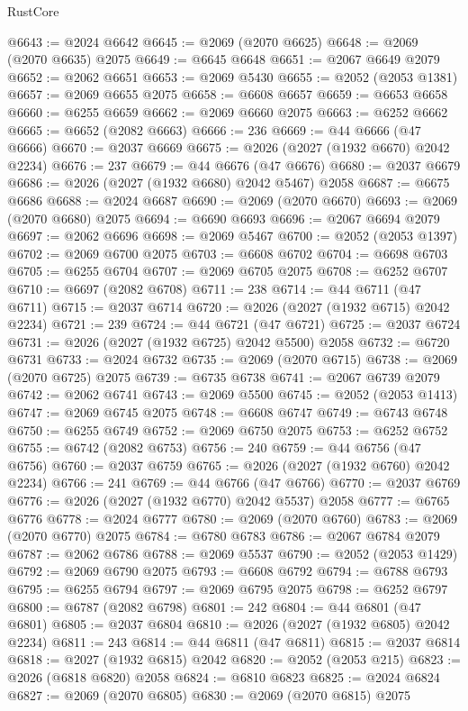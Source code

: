 \begin{lexlean}{RustCore}
\begin{coremodule}
@6643 := @2024 @6642
@6645 := @2069 (@2070 @6625)
@6648 := @2069 (@2070 @6635) @2075
@6649 := @6645 @6648
@6651 := @2067 @6649 @2079
@6652 := @2062 @6651
@6653 := @2069 @5430
@6655 := @2052 (@2053 @1381)
@6657 := @2069 @6655 @2075
@6658 := @6608 @6657
@6659 := @6653 @6658
@6660 := @6255 @6659
@6662 := @2069 @6660 @2075
@6663 := @6252 @6662
@6665 := @6652 (@2082 @6663)
@6666 := 236
@6669 := @44 @6666 (@47 @6666)
@6670 := @2037 @6669
@6675 := @2026 (@2027 (@1932 @6670) @2042 @2234)
@6676 := 237
@6679 := @44 @6676 (@47 @6676)
@6680 := @2037 @6679
@6686 := @2026 (@2027 (@1932 @6680) @2042 @5467) @2058
@6687 := @6675 @6686
@6688 := @2024 @6687
@6690 := @2069 (@2070 @6670)
@6693 := @2069 (@2070 @6680) @2075
@6694 := @6690 @6693
@6696 := @2067 @6694 @2079
@6697 := @2062 @6696
@6698 := @2069 @5467
@6700 := @2052 (@2053 @1397)
@6702 := @2069 @6700 @2075
@6703 := @6608 @6702
@6704 := @6698 @6703
@6705 := @6255 @6704
@6707 := @2069 @6705 @2075
@6708 := @6252 @6707
@6710 := @6697 (@2082 @6708)
@6711 := 238
@6714 := @44 @6711 (@47 @6711)
@6715 := @2037 @6714
@6720 := @2026 (@2027 (@1932 @6715) @2042 @2234)
@6721 := 239
@6724 := @44 @6721 (@47 @6721)
@6725 := @2037 @6724
@6731 := @2026 (@2027 (@1932 @6725) @2042 @5500) @2058
@6732 := @6720 @6731
@6733 := @2024 @6732
@6735 := @2069 (@2070 @6715)
@6738 := @2069 (@2070 @6725) @2075
@6739 := @6735 @6738
@6741 := @2067 @6739 @2079
@6742 := @2062 @6741
@6743 := @2069 @5500
@6745 := @2052 (@2053 @1413)
@6747 := @2069 @6745 @2075
@6748 := @6608 @6747
@6749 := @6743 @6748
@6750 := @6255 @6749
@6752 := @2069 @6750 @2075
@6753 := @6252 @6752
@6755 := @6742 (@2082 @6753)
@6756 := 240
@6759 := @44 @6756 (@47 @6756)
@6760 := @2037 @6759
@6765 := @2026 (@2027 (@1932 @6760) @2042 @2234)
@6766 := 241
@6769 := @44 @6766 (@47 @6766)
@6770 := @2037 @6769
@6776 := @2026 (@2027 (@1932 @6770) @2042 @5537) @2058
@6777 := @6765 @6776
@6778 := @2024 @6777
@6780 := @2069 (@2070 @6760)
@6783 := @2069 (@2070 @6770) @2075
@6784 := @6780 @6783
@6786 := @2067 @6784 @2079
@6787 := @2062 @6786
@6788 := @2069 @5537
@6790 := @2052 (@2053 @1429)
@6792 := @2069 @6790 @2075
@6793 := @6608 @6792
@6794 := @6788 @6793
@6795 := @6255 @6794
@6797 := @2069 @6795 @2075
@6798 := @6252 @6797
@6800 := @6787 (@2082 @6798)
@6801 := 242
@6804 := @44 @6801 (@47 @6801)
@6805 := @2037 @6804
@6810 := @2026 (@2027 (@1932 @6805) @2042 @2234)
@6811 := 243
@6814 := @44 @6811 (@47 @6811)
@6815 := @2037 @6814
@6818 := @2027 (@1932 @6815) @2042
@6820 := @2052 (@2053 @215)
@6823 := @2026 (@6818 @6820) @2058
@6824 := @6810 @6823
@6825 := @2024 @6824
@6827 := @2069 (@2070 @6805)
@6830 := @2069 (@2070 @6815) @2075

\end{coremodule}
\end{lexlean}

